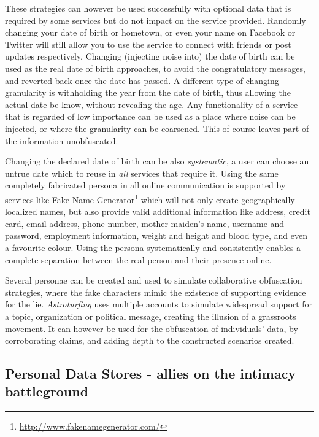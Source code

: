 \documentclass{IOS-Book-Article}     %
\begin{document}
These strategies can however be used successfully with optional data that 
is required by some services but do not impact on the service provided. 
Randomly changing your date of birth or hometown, or even your name on Facebook 
or Twitter will still allow you to use the service to connect with friends or 
post updates respectively. Changing (injecting noise into) the date of birth 
can be used as the real date of birth approaches, to avoid the 
congratulatory messages, and reverted back once the date has passed. A 
different type of changing granularity is withholding the year from the 
date of birth, thus allowing the actual date be know, without revealing the 
age. Any functionality of a service that is regarded of low importance can be 
used as a place where noise can be injected, or where the granularity can be 
coarsened. This of course leaves part of the information unobfuscated. 

Changing the declared date of birth can be also \emph{systematic}, a user can 
choose an untrue date which to reuse in \emph{all} services that require it. 
Using the same completely fabricated persona in all online communication is 
supported by services like Fake Name 
Generator\footnote{\url{http://www.fakenamegenerator.com/}} which will not only 
create geographically localized names, but also provide valid additional 
information like address, credit card, email address, phone number, mother 
maiden's name, username and password, employment information, weight and height 
and blood type, and even a favourite colour. Using the persona systematically 
and consistently enables a complete separation between the real person and their 
presence online. 

Several personae can be created and used to simulate collaborative obfuscation 
strategies, where the fake characters mimic the existence of supporting 
evidence for the lie. \emph{Astroturfing} uses multiple accounts to simulate
widespread support for a topic, organization or political message, 
creating the illusion of a grassroots movement. It can however be used for
the obfuscation of individuals' data, by corroborating claims, and adding depth
to the constructed scenarios created.

\subsection{Personal Data Stores - allies on the intimacy battleground}
\end{document}
